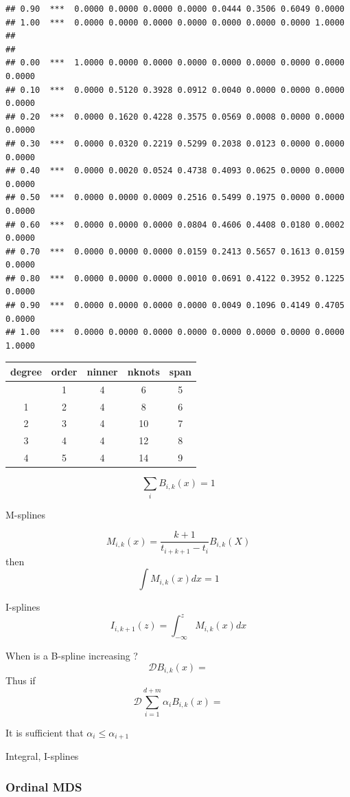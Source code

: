 \documentclass[
  12pt,
]{article}
\begin{document}
\begin{verbatim}
## 0.90  ***  0.0000 0.0000 0.0000 0.0000 0.0444 0.3506 0.6049 0.0000 
## 1.00  ***  0.0000 0.0000 0.0000 0.0000 0.0000 0.0000 0.0000 1.0000 
## 
## 
## 0.00  ***  1.0000 0.0000 0.0000 0.0000 0.0000 0.0000 0.0000 0.0000 0.0000 
## 0.10  ***  0.0000 0.5120 0.3928 0.0912 0.0040 0.0000 0.0000 0.0000 0.0000 
## 0.20  ***  0.0000 0.1620 0.4228 0.3575 0.0569 0.0008 0.0000 0.0000 0.0000 
## 0.30  ***  0.0000 0.0320 0.2219 0.5299 0.2038 0.0123 0.0000 0.0000 0.0000 
## 0.40  ***  0.0000 0.0020 0.0524 0.4738 0.4093 0.0625 0.0000 0.0000 0.0000 
## 0.50  ***  0.0000 0.0000 0.0009 0.2516 0.5499 0.1975 0.0000 0.0000 0.0000 
## 0.60  ***  0.0000 0.0000 0.0000 0.0804 0.4606 0.4408 0.0180 0.0002 0.0000 
## 0.70  ***  0.0000 0.0000 0.0000 0.0159 0.2413 0.5657 0.1613 0.0159 0.0000 
## 0.80  ***  0.0000 0.0000 0.0000 0.0010 0.0691 0.4122 0.3952 0.1225 0.0000 
## 0.90  ***  0.0000 0.0000 0.0000 0.0000 0.0049 0.1096 0.4149 0.4705 0.0000 
## 1.00  ***  0.0000 0.0000 0.0000 0.0000 0.0000 0.0000 0.0000 0.0000 1.0000
\end{verbatim}

\begin{longtable}[]{@{}ccccc@{}}
\toprule\noalign{}
degree & order & ninner & nknots & span \\
\midrule\noalign{}
\endhead
\bottomrule\noalign{}
\endlastfoot
0 & 1 & 4 & 6 & 5 \\
1 & 2 & 4 & 8 & 6 \\
2 & 3 & 4 & 10 & 7 \\
3 & 4 & 4 & 12 & 8 \\
4 & 5 & 4 & 14 & 9 \\
\end{longtable}

\[
\sum_i B_{i,k}(x)=1
\]

M-splines

\[
M_{i,k}(x)=\frac{k+1}{t_{i+k+1}-t_i}B_{i,k}(X)
\] then \[
\int M_{i,k}(x)dx=1
\]

I-splines \[
I_{i,k+1}(z)=\int_{-\infty}^zM_{i,k}(x)dx
\]

When is a B-spline increasing ? \[
\mathcal{D}B_{i,k}(x)=
\] Thus if \[
\mathcal{D}\sum_{i=1}^{d+m}\alpha_iB_{i,k}(x)=
\]

It is sufficient that \(\alpha_i\leq\alpha_{i+1}\)

Integral, I-splines

\subsubsection{Ordinal MDS}\label{ordinal-mds}
\end{document}
